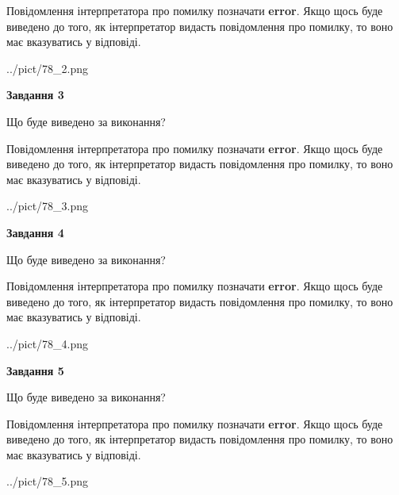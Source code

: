\documentclass[12pt, ukrainian]{article}
\begin{document}
{\begin {large}
Повідомлення інтерпретатора про помилку позначати \textbf{error}.
Якщо щось буде виведено до того, як інтерпретатор видасть повідомлення про помилку, 
то воно має вказуватись у відповіді. \par


\begin{center}
	{../pict/78_2.png}
\end{center}
\newpage

{\begin {center}\textbf{Завдання 3}\end {center}}\par
Що буде виведено за виконання?

Повідомлення інтерпретатора про помилку позначати \textbf{error}.
Якщо щось буде виведено до того, як інтерпретатор видасть повідомлення про помилку, 
то воно має вказуватись у відповіді. \par


\begin{center}
	{../pict/78_3.png}
\end{center}
\newpage

{\begin {center}\textbf{Завдання 4}\end {center}}\par
Що буде виведено за виконання?

Повідомлення інтерпретатора про помилку позначати \textbf{error}.
Якщо щось буде виведено до того, як інтерпретатор видасть повідомлення про помилку, 
то воно має вказуватись у відповіді. \par


\begin{center}
	{../pict/78_4.png}
\end{center}
\newpage

{\begin {center}\textbf{Завдання 5}\end {center}}\par
Що буде виведено за виконання?

Повідомлення інтерпретатора про помилку позначати \textbf{error}.
Якщо щось буде виведено до того, як інтерпретатор видасть повідомлення про помилку, 
то воно має вказуватись у відповіді. \par


\begin{center}
	{../pict/78_5.png}
\end{center}
\newpage


\end{large}}
\end{document}
